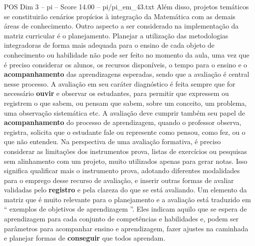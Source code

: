 \begin{textsample}{POS Dim 3 – pi – Score 14.00 – pi/pi\_em\_43.txt}
Além disso, projetos temáticos se constituirão cenários propícios à integração da Matemática com as demais áreas de conhecimento.
Outro aspecto a ser considerado na implementação da matriz curricular é o planejamento.
Planejar a utilização das metodologias integradoras de forma mais adequada para o ensino de cada objeto de conhecimento ou habilidade não pode ser feito no momento da aula, uma vez que é preciso considerar os alunos, os recursos disponíveis, o tempo para o ensino e o \textbf{acompanhamento} das aprendizagens esperadas, sendo que a avaliação é central nesse processo.
A avaliação em seu caráter diagnóstico é feita sempre que for necessário \textbf{ouvir} e observar os estudantes, para permitir que expressem ou registrem o que sabem, ou pensam que sabem, sobre um conceito, um problema, uma observação sistemática etc.
A avaliação deve cumprir também seu papel de \textbf{acompanhamento} do processo de aprendizagem, quando o professor observa, registra, solicita que o estudante fale ou represente como pensou, como fez, ou o que não entendeu.
Na perspectiva de uma avaliação formativa, é preciso considerar as limitações dos instrumentos prova, listas de exercícios ou pesquisas sem alinhamento com um projeto, muito utilizados apenas para gerar notas.
Isso significa qualificar mais o instrumento prova, adotando diferentes modalidades para o emprego desse recurso de avaliação, e inserir outras formas de avaliar validadas pelo \textbf{registro} e pela clareza do que se está avaliando.
Um elemento da matriz que é muito relevante para o planejamento e a avaliação está traduzido em “ exemplos de objetivos de aprendizagem ”.
Eles indicam aquilo que se espera de aprendizagem para cada conjunto de competências e habilidades e, podem ser parâmetros para acompanhar ensino e aprendizagem, fazer ajustes na caminhada e planejar formas de \textbf{conseguir} que todos aprendam.

\end{textsample}
